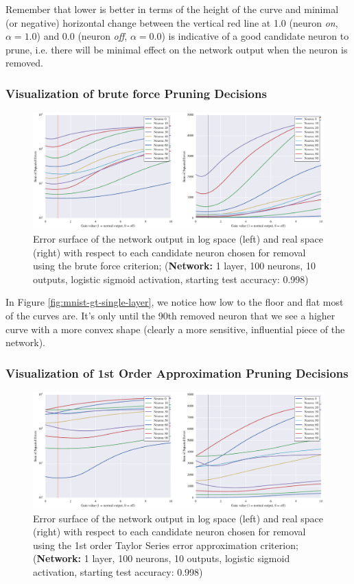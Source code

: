 Remember that lower is better in terms of the height of the curve and minimal (or negative) horizontal change between the vertical red line at 1.0 (neuron \textit{on}, $\alpha = 1.0$) and 0.0 (neuron \textit{off}, $\alpha = 0.0$) is indicative of a good candidate neuron to prune, i.e. there will be minimal effect on the network output when the neuron is removed. 

\subsubsection{Visualization of brute force Pruning Decisions}
\begin{figure}[!ht]
\centering
\includegraphics[width=\linewidth]{mnist-acc99-gt-gain.pdf}
\caption{Error surface of the network output in log space (left) and real space (right) with respect to each candidate neuron chosen for removal using the brute force criterion; (\textbf{Network:} 1 layer, 100 neurons, 10 outputs, logistic sigmoid activation, starting test accuracy: 0.998)}
\label{fig:mnist-single-layer-gt}
\end{figure}

In Figure \ref{fig:mnist-gt-single-layer}, we notice how low to the floor and flat most of the curves are. It's only until the 90th removed neuron that we see a higher curve with a more convex shape (clearly a more sensitive, influential piece of the network). 

\subsubsection{Visualization of 1st Order Approximation Pruning Decisions}
\begin{figure}[!ht]
\centering
\includegraphics[width=\linewidth]{mnist-acc99-g1-gain.pdf}
\caption{Error surface of the network output in log space (left) and real space (right) with respect to each candidate neuron chosen for removal using the 1st order Taylor Series error approximation criterion; (\textbf{Network:} 1 layer, 100 neurons, 10 outputs, logistic sigmoid activation, starting test accuracy: 0.998)}
\label{fig:mnist-single-layer-g1}
\end{figure}

